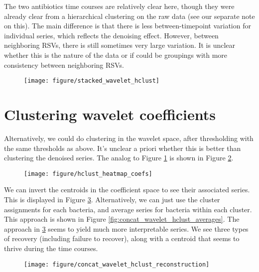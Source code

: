 \documentclass{article}
\begin{document}
The two antibiotics time courses are relatively clear here, though they were
already clear from a hierarchical clustering on the raw data (see our separate
note on this). The main difference is that there is less between-timepoint
variation for individual series, which reflects the denoising effect. However,
between neighboring RSVs, there is still sometimes very large variation. It is
unclear whether this is the nature of the data or if could be groupings with
more consistency between neighboring RSVs.

\begin{figure}[ht]
  \centering
  \texttt{[image: figure/stacked\_wavelet\_hclust]}
  \caption{\label{fig:stacked_wavelet_hclust} }
\end{figure}


\section{Clustering wavelet coefficients}

Alternatively, we could do clustering in the wavelet space, after thresholding
with the same thresholds as above. It's unclear a priori whether this is better
than clustering the denoised series. The analog to Figure
\ref{fig:stacked_wavelet_hclust} is shown in Figure
\ref{fig:hclust_heatmap_coefs}.

\begin{figure}[ht]
  \centering
  \texttt{[image: figure/hclust\_heatmap\_coefs]}
  \caption{\label{fig:hclust_heatmap_coefs} }
\end{figure}

We can invert the centroids in the coefficient space to see their associated
series. This is displayed in Figure
\ref{fig:concat_wavelet_hclust_reconstruction}. Alternatively, we can just use
the cluster assignments for each bacteria, and average series for bacteria
within each cluster. This approach is shown in Figure
\ref{fig:concat_wavelet_hclust_averages}. The approach in
\ref{fig:concat_wavelet_hclust_reconstruction} seems to yield much more
interpretable series. We see three types of recovery (including failure to
recover), along with a centroid that seems to thrive during the time courses.

\begin{figure}[ht]
  \centering
  \texttt{[image: figure/concat\_wavelet\_hclust\_reconstruction]}
  \caption{\label{fig:concat_wavelet_hclust_reconstruction} }
\end{figure}
\end{document}
